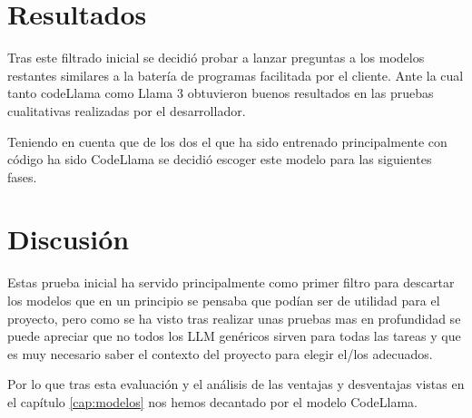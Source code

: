 \section{Resultados}

Tras este filtrado inicial se decidió probar a lanzar preguntas a los modelos restantes similares a la batería de programas facilitada por el cliente. Ante la cual tanto codeLlama como Llama 3 obtuvieron buenos resultados en las pruebas cualitativas realizadas por el desarrollador.

Teniendo en cuenta que de los dos el que ha sido entrenado principalmente con código ha sido CodeLlama se decidió escoger este modelo para las siguientes fases.

\section{Discusión}

Estas prueba inicial ha servido principalmente como primer filtro para descartar los modelos que en un principio se pensaba que podían ser de utilidad para el proyecto, pero como se ha visto tras realizar unas pruebas mas en profundidad se puede apreciar que no todos los LLM genéricos sirven para todas las tareas y que es muy necesario saber el contexto del proyecto para elegir el/los adecuados.

Por lo que tras esta evaluación y el análisis de las ventajas y desventajas vistas en el capítulo \ref{cap:modelos} nos hemos decantado por el modelo CodeLlama.